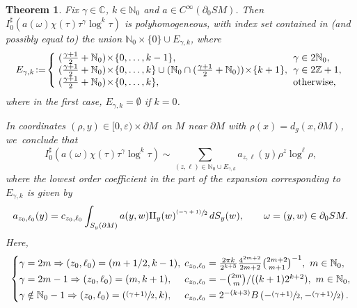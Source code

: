 \documentclass[JEP,XML,SOM,Unicode,NoFloatCountersInSection, NoEqCountersInSection,published]{cedram}
\newcommand{\psfrac}[2]{\sfrac{(#1)}{#2}}
\theoremstyle{plain}
\newtheorem{Theorem}{Theorem}[section]
\theoremstyle{definition}
\theoremstyle{remark}
\def\Cm{{\mathbb{C}}}
\def\Nm{{\mathbb{N}}}
\def\Zm{{\mathbb{Z}}}
\def\two{\mathrm{II}}
\newcommand{\adj}{I_0^\sharp}
\begin{document}
\begin{Theorem}\label{thm:I0starIDX}
Fix $\gamma\in \Cm$, $k\in \Nm_0$ and $a\in C^\infty(\partial_0 SM)$. Then $\adj (a(\omega) \chi(\tau) \tau^\gamma \log^k \tau)$ is polyhomogeneous,
with index set contained in (and possibly equal to) the union $\Nm_0\times \{0\} \cup E_{\gamma,k}$, where
\begin{equation}\arraycolsep3pt
E_{\gamma,k} \!:=\! \left\{
\begin{array}{ll}
(\frac{\gamma+1}{2} + \Nm_0) \!\times\! \{0, \dots, k-1\}, & \gamma\in 2\Nm_0, \\
(\frac{\gamma+1}{2} + \Nm_0) \!\times\! \{0, \dots, k\} \cup (\Nm_0 \cap (\frac{\gamma+1}{2} + \Nm_0)) \!\times\! \{k+1\}, & \gamma\in 2\Zm+1, \\
(\frac{\gamma+1}{2} + \Nm_0) \!\times\! \{0, \dots, k\}, & \text{otherwise},
\end{array}
\right.
\label{eq:Egamk}
\end{equation}
where in the first case, $E_{\gamma,k} = \emptyset$ if $k=0$.

In coordinates $(\rho,y)\in [0,\varepsilon)\times \partial M$ on $M$ near $\partial M$
with $\rho(x) = d_g(x,\partial M)$, we~conclude that
\begin{equation*}
\adj (a(\omega) \chi(\tau) \tau^\gamma \log^k \tau) \sim \sum_{(z,\ell)\in \Nm_0 \cup E_{\gamma,k}} a_{z,\ell}(y) \rho^z \log^\ell \rho,
\end{equation*}
where the lowest order coefficient in the part of the expansion corresponding to $E_{\gamma,k}$ is given by
\begin{equation*}
a_{z_0,\ell_0}(y) = c_{z_0,\ell_0} \int_{S_y (\partial M)} a(y,w) \two_y(w)^{\psfrac{-\gamma+1}{2}}\,dS_y(w), \qquad \omega = (y,w)\in \partial_0 SM.
\end{equation*}
Here,
\begin{equation}
\begin{cases}
\gamma=2m \Rightarrow (z_0,\ell_0) = (m+1/2,k-1), &\hspace*{-2mm}c_{z_0,\ell_0} = \frac{2\pi k}{2^{k+3}} \frac{4^{2m+2}}{2m+2}\binom{2m+2}{m+1}^{-1},\ m\in\Nm_0, \\[0.5ex]
\gamma=2m-1 \Rightarrow (z_0,\ell_0) = (m, k+1), &\hspace*{-2mm} c_{z_0,\ell_0} = -\binom{2m}{m}/((k+1) 2^{k+2}), \ m\in\Nm_0, \\[0.5ex]
\gamma\notin \Nm_0-1 \Rightarrow (z_0,\ell_0) = (\psfrac{\gamma\!+\!1}{2},k), &\hspace*{-2mm} c_{z_0,\ell_0} = {2^{-(k+3)}}
B\left(-\psfrac{\gamma\!+\!1}{2}, -\psfrac{\gamma\!+\!1}{2} \right).
\end{cases}
\label{eq:Agk}
\end{equation}
\end{Theorem}
\end{document}
